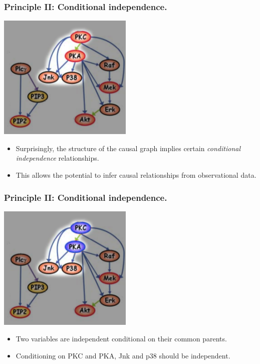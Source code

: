 \documentclass{beamer}
\begin{document}
\begin{frame}
\frametitle{Principle II: Conditional independence.}

\begin{center}
\includegraphics[scale = 0.5]{../images/fig03_01.png}
\end{center}

\begin{itemize}
\item Surprisingly, the structure of the causal graph implies certain \emph{conditional independence} relationships.
\item This allows the potential to infer causal relationships from observational data.
\end{itemize}

\end{frame}

\begin{frame}
\frametitle{Principle II: Conditional independence.}

\begin{center}
\includegraphics[scale = 0.5]{../images/fig03_02.png}
\end{center}

\begin{itemize}
\item Two variables are independent conditional on their common parents.
\item Conditioning on PKC and PKA, Jnk and p38 should be independent.
\end{itemize}

\end{frame}
\end{document}
